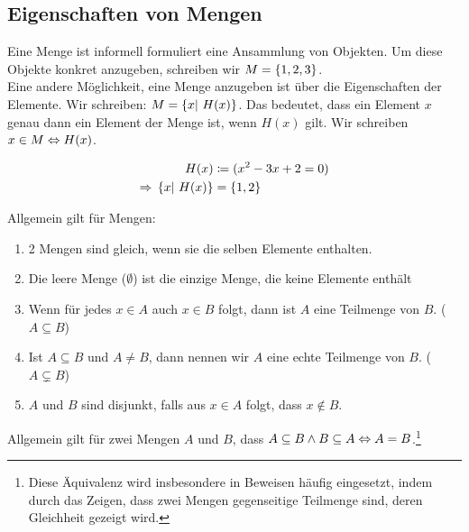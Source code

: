 \thispagestyle{pagenumberonly}

\subsection{Eigenschaften von Mengen}

\begin{notation}
    Eine Menge ist informell formuliert eine Ansammlung von Objekten.
    Um diese Objekte konkret anzugeben, schreiben wir $M = \left\{1, 2, 3\right\}$.\\
    Eine andere Möglichkeit, eine Menge anzugeben ist über die Eigenschaften der Elemente.
    Wir schreiben: $M=\left\{x|~H(x)\right\}$. Das bedeutet, dass ein Element $x$ genau dann ein Element der Menge ist, wenn $H(x)$ gilt.
    Wir schreiben $x\in M \Leftrightarrow{} H(x)$.
\end{notation}

\begin{beispiel}
    \begin{align*}
        H(x) &\coloneqq (x^2-3x+2 = 0)\\
        \Rightarrow{} \left\{x|~H(x)\right\} &= \left\{1,2\right\}
    \end{align*}
\end{beispiel}

\begin{definition}
    Allgemein gilt für Mengen:
    \theoremescape
    \begin{enumerate}
        \item 2 Mengen sind gleich, wenn sie die selben Elemente enthalten.
        \item Die leere Menge ($\emptyset$) ist die einzige Menge, die keine Elemente enthält
        \item Wenn für jedes $x\in A$ auch $x\in B$ folgt, dann ist $A$ eine Teilmenge von $B$. ($A\subseteq B$)
        \item Ist $A\subseteq B$ und $A\neq B$, dann nennen wir $A$ eine echte Teilmenge von $B$. ($A\subsetneq B$)
        \item $A$ und $B$ sind disjunkt, falls aus $x\in A$ folgt, dass $x\not\in B$.
    \end{enumerate}
\end{definition}

\begin{bemerkung}
    Allgemein gilt für zwei Mengen $A$ und $B$, dass $A\subseteq B \land B\subseteq A \Leftrightarrow{} A = B$.\footnote{Diese Äquivalenz wird insbesondere in Beweisen häufig eingesetzt, indem durch das Zeigen, dass zwei Mengen gegenseitige Teilmenge sind, deren Gleichheit gezeigt wird.}
\end{bemerkung}

